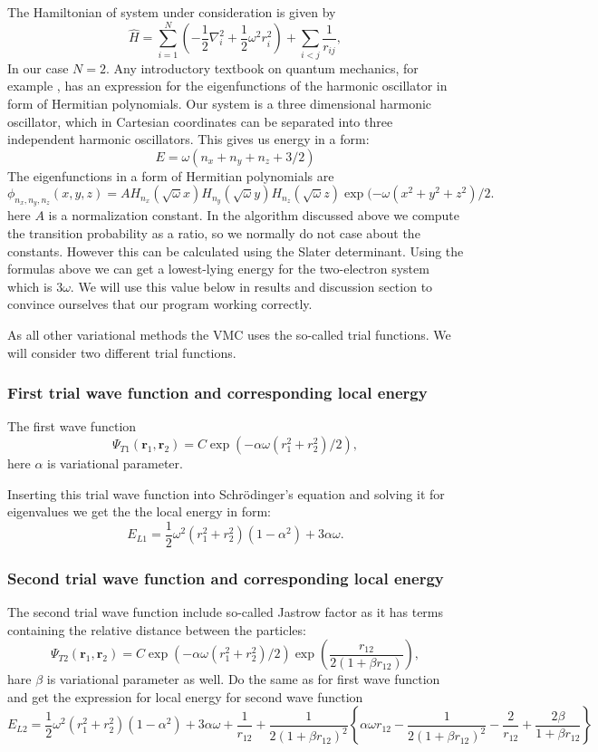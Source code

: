 \documentclass[10pt]{article}
\begin{document}
The Hamiltonian of system under consideration is given by
\begin{equation}
  \label{eq:finalH}
  \hat{H}=\sum_{i=1}^{N} \left(  -\frac{1}{2} \nabla_i^2 + \frac{1}{2} \omega^2r_i^2  \right)+\sum_{i<j}\frac{1}{r_{ij}},
\end{equation}
In our case $N=2$. 
Any introductory textbook on quantum mechanics, for example \cite{Liboff}, has an expression for the eigenfunctions of the harmonic oscillator in form of Hermitian polynomials.  Our system is a three dimensional harmonic oscillator, which in Cartesian coordinates can be separated into three independent harmonic oscillators. This gives us energy in a form:
\begin{equation*}
E=\omega(n_x+n_y+n_z+3/2) 
  \end{equation*}
  The eigenfunctions in a form of Hermitian polynomials are
\begin{equation*}
  \phi_{n_x,n_y,n_z}(x,y,z) = A H_{n_x}(\sqrt{\omega}x)H_{n_y}(\sqrt{\omega}y)H_{n_z}(\sqrt{\omega}z)\exp{(-\omega(x^2+y^2+z^2)/2}.
  \end{equation*}
 here $A$ is a normalization constant. In the algorithm discussed above we compute the transition probability as a ratio, so we normally do not case about the constants. However this can be calculated using the Slater determinant. 
 Using the formulas above we can get a lowest-lying energy for the two-electron system which is $3\omega$. We will use this value below in results and discussion section to convince ourselves that our program working correctly.

As all other variational methods the VMC uses the so-called trial functions. We will consider two different trial functions. 
\subsubsection{First trial wave function and corresponding local energy}
The first wave function
\[
   \Psi_{T1}(\mathbf{r}_1,\mathbf{r}_2) = C\exp{\left(-\alpha\omega(r_1^2+r_2^2)/2\right)},
\]
here  $\alpha$ is variational parameter.

Inserting this trial wave function into Schr\"{o}dinger's equation and solving it for eigenvalues we get the the local energy in form: 
\[ 
E_{L1} = \frac{1}{2}\omega^2\left( r_1^2+r_2^2\right)\left(1-\alpha^2\right) +3\alpha\omega.
\]
\subsubsection{Second trial wave function and corresponding local energy}
The second trial wave function include so-called Jastrow factor as it has terms containing the relative distance between the particles:
\[
    \Psi_{T2}(\mathbf{r}_1,\mathbf{r}_2) =
    C\exp{\left(-\alpha\omega(r_1^2+r_2^2)/2\right)}
    \exp{\left(\frac{r_{12}}{2(1+\beta r_{12})}\right)},
\]
hare $\beta$ is variational parameter as well.
Do the same as for first wave function and get the expression for local energy for second wave function
\[ 
E_{L2} = \frac{1}{2}\omega^2\left( r_1^2+r_2^2\right)\left(1-\alpha^2\right) +3\alpha\omega+\frac{1}{r_{12}}+\frac{1}{2(1+\beta r_{12})^2}\left\{\alpha\omega r_{12}-\frac{1}{2(1+\beta r_{12})^2}-\frac{2}{r_{12}}+\frac{2\beta}{1+\beta r_{12}}\right\}
\]
\end{document}
